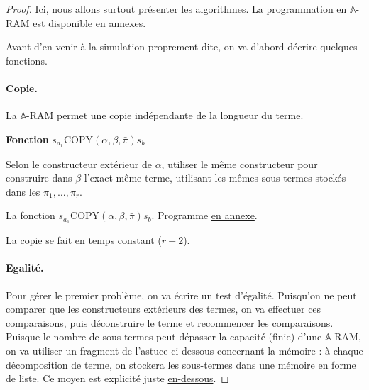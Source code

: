 \documentclass{report}
\newcommand{\bbA}{\mathbb{A}}
\begin{document}
				\begin{proof}
					Ici, nous allons surtout présenter les algorithmes. La programmation en $\bbA$-RAM est disponible en \hyperref[sec:annexes_programmes]{annexes}.
					
					Avant d'en venir à la simulation proprement dite, on va d'abord décrire quelques fonctions.
			
					
					\paragraph{Copie.}
					
					La $\bbA$-RAM permet une copie indépendante de la longueur du terme. 
					
					\espace 
					
					\begin{algorithm}[H]
						\label{algo:A_RAM_fn_COPY}
						
						\textbf{Fonction} $s_{a_1}\text{COPY}(\alpha, \beta, \bar{\pi}) s_b$
						
						
						\espace 
						
						
							
						Selon le constructeur extérieur de $\alpha$, utiliser le même constructeur pour construire dans $\beta$ l'exact même terme, utilisant les mêmes sous-termes stockés dans les $\pi_1, \dots, \pi_r$.
						
						\caption{La fonction $s_{a_1}\text{COPY}(\alpha, \beta, \bar{\pi}) s_b$. Programme \hyperref[prog:A_RAM_fn_COPY]{en annexe}.}
					\end{algorithm}
						
					\espace
					
					La copie se fait en temps constant ($r+2$).
					
	
					\paragraph{Egalité.}
					Pour gérer le premier problème, on va écrire un test d'égalité. Puisqu'on ne peut comparer que les constructeurs extérieurs des termes, on va effectuer ces comparaisons, puis déconstruire le terme et recommencer les comparaisons. Puisque le nombre de sous-termes peut dépasser la capacité (finie) d'une $\bbA$-RAM, on va utiliser un fragment de l'astuce ci-dessous concernant la mémoire : à chaque décomposition de terme, on stockera les sous-termes dans une mémoire en forme de liste. Ce moyen est explicité juste \hyperref[par:A_RAM_memoire]{en-dessous}.
	

\end{proof}
\end{document}
